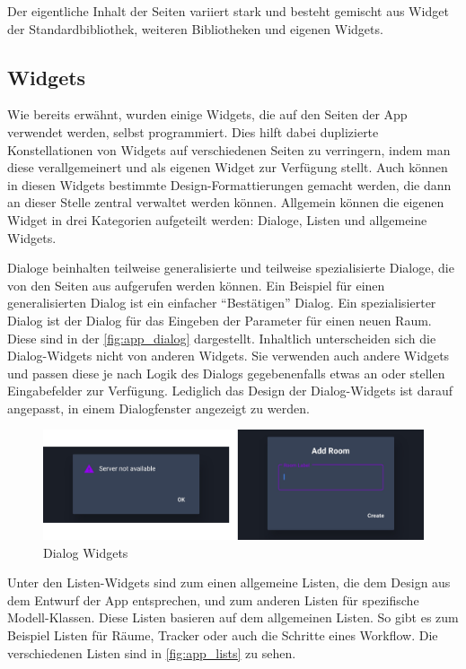 Der eigentliche Inhalt der Seiten variiert stark und besteht gemischt aus Widget der Standardbibliothek, weiteren Bibliotheken
und eigenen Widgets.

\FloatBarrier
\subsection{Widgets}

Wie bereits erwähnt, wurden einige Widgets, die auf den Seiten der App verwendet werden, selbst programmiert.
Dies hilft dabei duplizierte Konstellationen von Widgets auf verschiedenen Seiten zu verringern, indem man diese
verallgemeinert und als eigenen Widget zur Verfügung stellt.
Auch können in diesen Widgets bestimmte Design-Formattierungen gemacht werden, die dann an dieser Stelle zentral verwaltet
werden können.
Allgemein können die eigenen Widget in drei Kategorien aufgeteilt werden:
Dialoge, Listen und allgemeine Widgets.

Dialoge beinhalten teilweise generalisierte und teilweise spezialisierte Dialoge, die von den Seiten aus aufgerufen werden können.
Ein Beispiel für einen generalisierten Dialog ist ein einfacher \enquote{Bestätigen} Dialog.
Ein spezialisierter Dialog ist der Dialog für das Eingeben der Parameter für einen neuen Raum. 
Diese sind in der \autoref{fig:app_dialog} dargestellt.
Inhaltlich unterscheiden sich die Dialog-Widgets nicht von anderen Widgets.
Sie verwenden auch andere Widgets und passen diese je nach Logik des Dialogs gegebenenfalls etwas an oder stellen
Eingabefelder zur Verfügung.
Lediglich das Design der Dialog-Widgets ist darauf angepasst, in einem Dialogfenster angezeigt zu werden.

\begin{figure}[]
	\includegraphics[width=\textwidth]{images/app_dialog.png}
	\centering
	\caption{Dialog Widgets}
	\label{fig:app_dialog}
\end{figure}

Unter den Listen-Widgets sind zum einen allgemeine Listen, die dem Design aus dem Entwurf der App entsprechen, und zum
anderen Listen für spezifische Modell-Klassen.
Diese Listen basieren auf dem allgemeinen Listen.
So gibt es zum Beispiel Listen für Räume, Tracker oder auch die Schritte eines Workflow.
Die verschiedenen Listen sind in \autoref{fig:app_lists} zu sehen.

